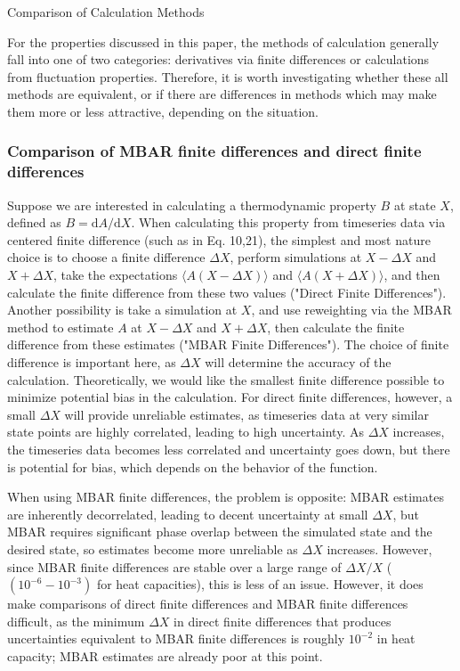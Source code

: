 \documentclass[aps,pre,twocolumn,nofootinbib,superscriptaddress,linenumbers,10pt, draft,tightenlines]{revtex4-1}
\begin{document}
\begin{subsection}{Comparison of Calculation Methods}

For the properties discussed in this paper, the methods of calculation generally fall into one of two categories: derivatives via finite differences or calculations from fluctuation properties. Therefore, it is worth investigating whether these all methods are equivalent, or if there are differences in methods which may make them more or less attractive, depending on the situation.  

\subsubsection{Comparison of MBAR finite differences and direct finite differences}
Suppose we are interested in calculating a thermodynamic property $B$ at state $X$, defined as $B=\mathrm{d}A/\mathrm{d}X$.
When calculating this property from timeseries data via centered finite difference (such as in Eq. 10,21), the simplest and most nature choice is to choose a finite difference $\Delta X$, perform simulations at $X-\Delta X$ and $X+\Delta X$, take the expectations $\langle A(X-\Delta X) \rangle$ and $\langle A(X+\Delta X)\rangle $, and then calculate the finite difference from these two values ("Direct Finite Differences").
  Another possibility is take a simulation at $X$, and use reweighting via the MBAR method \cite{MBAR} to estimate $A$ at $X-\Delta X$ and $X+\Delta X$, then calculate the finite difference from these estimates ("MBAR Finite Differences").  
The choice of finite difference is important here, as $\Delta X$ will determine the accuracy of the calculation. Theoretically, we would like the smallest finite difference possible to minimize potential bias in the calculation.  For direct finite differences, however, a small $\Delta X $ will provide unreliable estimates, as timeseries data at very similar state points are highly correlated, leading to high uncertainty.  As $ \Delta X $ increases, the timeseries data becomes less correlated and uncertainty goes down, but there is potential for bias, which depends on the behavior of the function.

When using MBAR finite differences, the problem is opposite: MBAR estimates are inherently decorrelated, leading to decent uncertainty at small $\Delta X$, but MBAR requires significant phase overlap between the simulated state and the desired state, so estimates become more unreliable as $\Delta X$ increases. However, since MBAR finite differences are stable over a large range of $\Delta X/X$ ($(10^{-6}-10^{-3})$ for heat capacities), this is less of an issue. However, it does make comparisons of direct finite differences and MBAR finite differences difficult, as the minimum $\Delta X$ in direct finite differences that produces uncertainties equivalent to MBAR finite differences is roughly $10^{-2}$ in heat capacity; MBAR estimates are already poor at this point.


\end{subsection}
\end{document}
